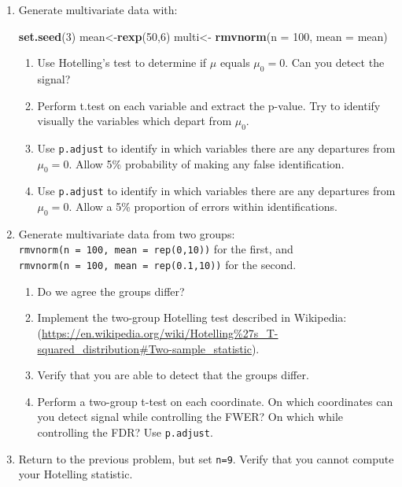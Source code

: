 \documentclass[]{book}
\newenvironment{Shaded}{\begin{snugshade}}{\end{snugshade}}
\newcommand{\KeywordTok}[1]{\textcolor[rgb]{0.13,0.29,0.53}{\textbf{#1}}}
\newcommand{\DataTypeTok}[1]{\textcolor[rgb]{0.13,0.29,0.53}{#1}}
\newcommand{\DecValTok}[1]{\textcolor[rgb]{0.00,0.00,0.81}{#1}}
\newcommand{\StringTok}[1]{\textcolor[rgb]{0.31,0.60,0.02}{#1}}
\newcommand{\NormalTok}[1]{#1}
\providecommand{\tightlist}{%
  \setlength{\itemsep}{0pt}\setlength{\parskip}{0pt}}
\theoremstyle{definition}
\theoremstyle{definition}
\theoremstyle{definition}
\theoremstyle{remark}
\begin{document}
\begin{enumerate}
\def\labelenumi{\arabic{enumi}.}
\item
  Generate multivariate data with:

\begin{Shaded}
\begin{Highlighting}[]
\KeywordTok{set.seed}\NormalTok{(}\DecValTok{3}\NormalTok{)}
\NormalTok{mean<-}\KeywordTok{rexp}\NormalTok{(}\DecValTok{50}\NormalTok{,}\DecValTok{6}\NormalTok{)}
\NormalTok{multi<-}\StringTok{  }\KeywordTok{rmvnorm}\NormalTok{(}\DataTypeTok{n =} \DecValTok{100}\NormalTok{, }\DataTypeTok{mean =}\NormalTok{ mean) }
\end{Highlighting}
\end{Shaded}

  \begin{enumerate}
  \def\labelenumii{\alph{enumii}.}
  \tightlist
  \item
    Use Hotelling's test to determine if \(\mu\) equals \(\mu_0=0\). Can
    you detect the signal?
  \item
    Perform t.test on each variable and extract the p-value. Try to
    identify visually the variables which depart from \(\mu_0\).
  \item
    Use \texttt{p.adjust} to identify in which variables there are any
    departures from \(\mu_0=0\). Allow 5\% probability of making any
    false identification.
  \item
    Use \texttt{p.adjust} to identify in which variables there are any
    departures from \(\mu_0=0\). Allow a 5\% proportion of errors within
    identifications.
  \end{enumerate}
\item
  Generate multivariate data from two groups:
  \texttt{rmvnorm(n\ =\ 100,\ mean\ =\ rep(0,10))} for the first, and
  \texttt{rmvnorm(n\ =\ 100,\ mean\ =\ rep(0.1,10))} for the second.

  \begin{enumerate}
  \def\labelenumii{\alph{enumii}.}
  \tightlist
  \item
    Do we agree the groups differ?
  \item
    Implement the two-group Hotelling test described in Wikipedia:
    (\url{https://en.wikipedia.org/wiki/Hotelling\%27s_T-squared_distribution\#Two-sample_statistic}).
  \item
    Verify that you are able to detect that the groups differ.
  \item
    Perform a two-group t-test on each coordinate. On which coordinates
    can you detect signal while controlling the FWER? On which while
    controlling the FDR? Use \texttt{p.adjust}.
  \end{enumerate}
\item
  Return to the previous problem, but set \texttt{n=9}. Verify that you
  cannot compute your Hotelling statistic.
\end{enumerate}
\end{document}
